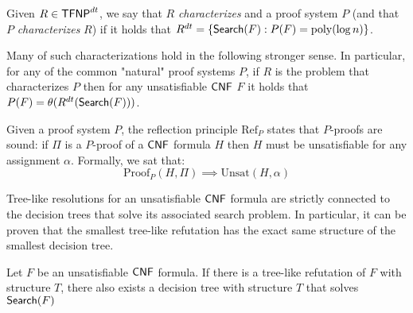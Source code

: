 \begin{definition}
    Given $R \in \mathsf{TFNP}^{dt}$, we say that $R$ \textit{characterizes} and a proof system $P$ (and that $P$ \textit{characterizes} $R$) if it holds that $R^{dt} = \{\mathsf{Search}(F) : P(F) = \mathrm{poly}(\log n)\}$.
\end{definition}

Many of such characterizations hold in the following stronger sense. In particular, for any of the common "natural" proof systems $P$, if $R$ is the problem that characterizes $P$ then for any unsatisfiable $\mathsf{CNF}$ $F$ it holds that $P(F) = \theta(R^{dt}(\mathsf{Search}(F)))$.

\begin{definition}
    Given a proof system $P$, the reflection principle $\mathrm{Ref}_P$ states that $P$-proofs are sound: if $\Pi$ is a $P$-proof of a $\mathsf{CNF}$ formula $H$ then $H$ must be unsatisfiable for any assignment $\alpha$. Formally, we sat that:
    \[\mathrm{Proof}_P(H, \Pi) \implies \mathrm{Unsat}(H, \alpha)\] 
\end{definition}


\newpage

Tree-like resolutions for an unsatisfiable $\mathsf{CNF}$ formula are strictly connected to the decision trees that solve its associated search problem. In particular, it can be proven that the smallest tree-like refutation has the exact same structure of the smallest decision tree. 

\begin{lemma} \label{lem:treeres_dt}
    \cite{treelike_res_size}
    Let $F$ be an unsatisfiable $\mathsf{CNF}$ formula. If there is a tree-like refutation of $F$ with structure $T$, there also exists a decision tree with structure $T$ that solves $\mathsf{Search}(F)$
\end{lemma}

